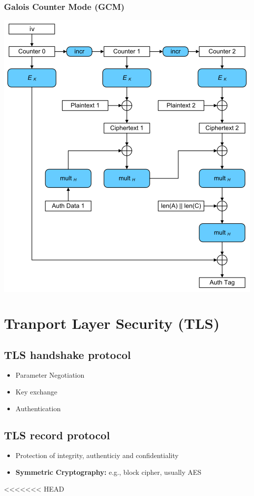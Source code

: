 \subsubsection{Galois Counter Mode (GCM)}
\begin{center}
  \includegraphics[width=0.5\columnwidth]{Resources/GCM-Galois_Counter_Mode_with_IV.svg.png}
\end{center}

\section{Tranport Layer Security (TLS)}
\subsection{TLS handshake protocol}
\begin{itemize}
  \item Parameter Negotiation
  \item Key exchange
  \item Authentication
\end{itemize}
\subsection{TLS record protocol}
\begin{itemize}
  \item Protection of integrity, authenticiy and confidentiality
  \item \textbf{Symmetric Cryptography:} e.g., block cipher, usually AES
\end{itemize}

<<<<<<< HEAD
